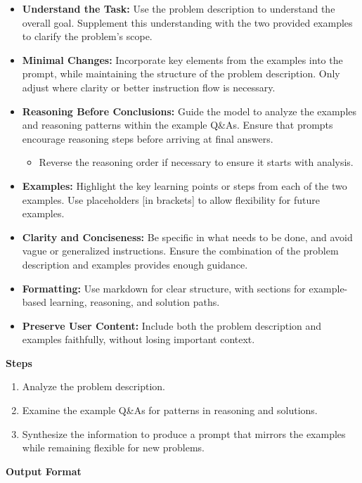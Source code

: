 \begin{tcolorbox}[breakable,colframe=mybluecolor!100, colback=mybluecolor!20, title=اعلان دستوری برای نمونه\/گیری براساس توضیح مسئله و چند نمونه مثال از مجموعه داده]
\begin{LTR}
	\begin{itemize}
		\item \textbf{Understand the Task:} Use the problem description to understand the overall goal. Supplement this understanding with the two provided examples to clarify the problem’s scope.
		\item \textbf{Minimal Changes:} Incorporate key elements from the examples into the prompt, while maintaining the structure of the problem description. Only adjust where clarity or better instruction flow is necessary.
		\item \textbf{Reasoning Before Conclusions:} Guide the model to analyze the examples and reasoning patterns within the example Q\&As. Ensure that prompts encourage reasoning steps before arriving at final answers.
		\begin{itemize}
			\item Reverse the reasoning order if necessary to ensure it starts with analysis.
		\end{itemize}
		\item \textbf{Examples:} Highlight the key learning points or steps from each of the two examples. Use placeholders [in brackets] to allow flexibility for future examples.
		\item \textbf{Clarity and Conciseness:} Be specific in what needs to be done, and avoid vague or generalized instructions. Ensure the combination of the problem description and examples provides enough guidance.
		\item \textbf{Formatting:} Use markdown for clear structure, with sections for example-based learning, reasoning, and solution paths.
		\item \textbf{Preserve User Content:} Include both the problem description and examples faithfully, without losing important context.
	\end{itemize}
	
	\textbf{Steps}
	
	\begin{enumerate}
		\item Analyze the problem description.
		\item Examine the example Q\&As for patterns in reasoning and solutions.
		\item Synthesize the information to produce a prompt that mirrors the examples while remaining flexible for new problems.
	\end{enumerate}
	
	\textbf{Output Format}  
	

\end{LTR}
\end{tcolorbox}
